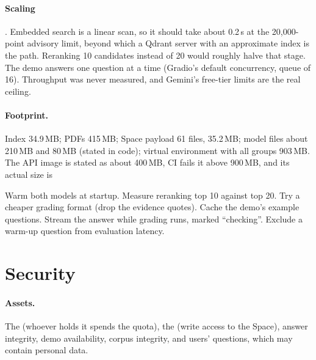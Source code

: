 \paragraph{Scaling} \tagI. Embedded search is a linear scan, so it should take about 0.2\,s at the 20,000-point advisory limit, beyond which a Qdrant server with an approximate index is the path. Reranking 10 candidates instead of 20 would roughly halve that stage. The demo answers one question at a time (Gradio's default concurrency, queue of 16). Throughput was never measured, and Gemini's free-tier limits are the real ceiling.

\paragraph{Footprint.} Index 34.9\,MB; PDFs 415\,MB; Space payload 61 files, 35.2\,MB; model files about 210\,MB and 80\,MB (stated in code); virtual environment with all groups 903\,MB. The API image is stated as about 400\,MB, CI fails it above 900\,MB, and its actual size is \NotDet

\begin{recommended}
Warm both models at startup. Measure reranking top 10 against top 20. Try a cheaper grading format (drop the evidence quotes). Cache the demo's example questions. Stream the answer while grading runs, marked ``checking''. Exclude a warm-up question from evaluation latency.
\end{recommended}

\section{Security}
\label{sec:security}

\paragraph{Assets.} The  (whoever holds it spends the quota), the  (write access to the Space), answer integrity, demo availability, corpus integrity, and users' questions, which may contain personal data.

